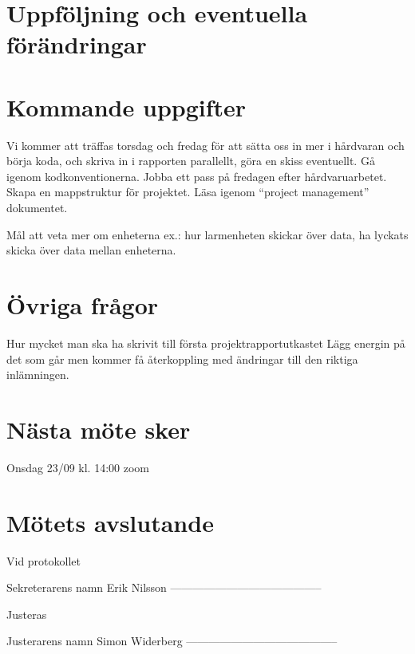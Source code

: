 \documentclass[a4paper]{article}
\begin{document}
\section{Uppföljning och eventuella förändringar}
\label{sec:uppf}





\section{Kommande uppgifter}
\label{sec:komm}
Vi kommer att träffas torsdag och fredag för att sätta oss in mer i hårdvaran och börja koda, och skriva in i rapporten parallellt, göra en skiss eventuellt. Gå igenom kodkonventionerna.
Jobba ett pass på fredagen efter hårdvaruarbetet. Skapa en mappstruktur för projektet. Läsa igenom “project management” dokumentet.
\newline \newline

Mål att veta mer om enheterna ex.: hur larmenheten skickar över data, ha lyckats skicka över data mellan enheterna.


\section{Övriga frågor}
\label{sec:övr}
Hur mycket man ska ha skrivit till första projektrapportutkastet
Lägg energin på det som går men kommer få återkoppling med ändringar till den
riktiga inlämningen.

\section{Nästa möte sker}
\label{sec:övr}
Onsdag 23/09 kl. 14:00 zoom

\section{Mötets avslutande}
\label{sec:övr}



Vid protokollet

Sekreterarens namn
Erik Nilsson
-----------------------------------------



Justeras


Justerarens namn
Simon Widerberg
-----------------------------------------
\end{document}
